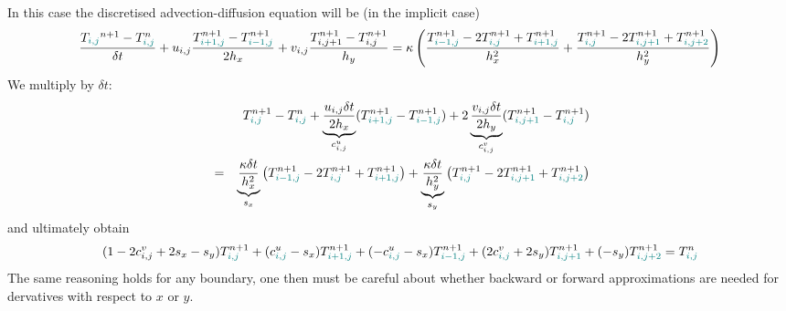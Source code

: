In this case the discretised advection-diffusion equation will be (in the implicit case)
\[
\frac{T_{\color{teal}i,j}^{n+1}-T^n_{\color{teal}i,j}}{\delta t} 
+ u_{i,j} \frac{T^{n+1}_{\color{teal}i+1,j} - T^{n+1}_{{\color{teal}i-1,j}}}{2h_x} 
+ v_{i,j} \frac{T_{i,j+1}^{n+1}-T_{i,j}^{n+1}}{h_y}
=
\kappa 
\left(
\frac{ T_{{\color{teal}i-1,j}}^{n+1}-2T_{{\color{teal}i,j}}^{n+1}+T_{{\color{teal}i+1,j}}^{n+1}  }{h_x^2} + 
\frac{T_{{\color{teal}i,j}}^{n+1}-2T_{{\color{teal}i,j+1}}^{n+1}+T_{{\color{teal}i,j+2}}^{n+1}}{h_y^2}
\right)
\]
We multiply by $\delta t$: 
\begin{eqnarray}
&&T_{{\color{teal}i,j}}^{n+1}-T^n_{\color{teal}i,j}
+ \underbrace{\frac{u_{i,j} \delta t}{2h_x}}_{c^u_{i,j}} 
(T^{n+1}_{\color{teal}i+1,j} - T^{n+1}_{{\color{teal}i-1,j}}) 
+ 2\underbrace{\frac{v_{i,j} \delta t}{2h_y}}_{c^v_{i,j}} 
(T^{n+1}_{\color{teal}i,j+1} - T^{n+1}_{{\color{teal}i,j}}) \nonumber\\
&=&
\underbrace{\frac{\kappa   \delta t}{h_x^2}}_{s_x}
\left(
 T_{{\color{teal}i-1,j}}^{n+1}-2T_{{\color{teal}i,j}}^{n+1}+T_{{\color{teal}i+1,j}}^{n+1}
\right) +
\underbrace{\frac{\kappa   \delta t}{h_y^2}}_{s_y}
\left(
T_{{\color{teal}i,j}}^{n+1}-2T_{{\color{teal}i,j+1}}^{n+1}+T_{{\color{teal}i,j+2}}^{n+1} 
\right)
\end{eqnarray}
and ultimately obtain
\[
(1-2c^v_{i,j}+2s_x-s_y)T_{{\color{teal}i,j}}^{n+1}
+(c^u_{{\color{teal} i,j}}-s_x)T_{{\color{teal}i+1,j}}^{n+1}
+(-c^u_{{\color{teal} i,j}}-s_x)T_{{\color{teal}i-1,j}}^{n+1}
+(2c^v_{{\color{teal} i,j}}+2s_y)T_{{\color{teal}i,j+1}}^{n+1}
+(-s_y)T_{{\color{teal}i,j+2}}^{n+1}
=T^n_{\color{teal}i,j}
\]
The same reasoning holds for any boundary, one then must be careful about whether
backward or forward approximations are needed for dervatives with respect to $x$ or $y$.























